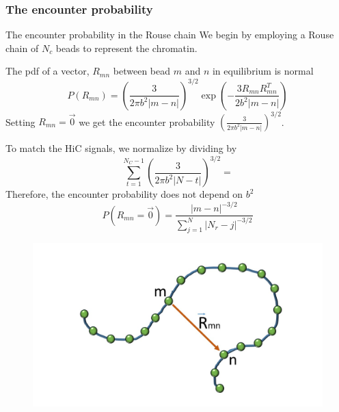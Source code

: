 \documentclass[8pt]{beamer}
\begin{document}
\subsubsection{The encounter probability}\label{subsubsection_theRouseEncounterProbability}
\begin{frame}{The encounter probability in the Rouse chain}
We begin by employing a Rouse chain of $N_c$ beads to represent the chromatin.

The pdf of a vector, $R_{mn}$ between bead $m$ and $n$ in equilibrium is normal
\begin{equation*}
P(R_{mn})=\left(\frac{3}{2\pi b^2 |m-n|}\right)^{3/2}\exp\left(-\frac{3R_{mn}R_{mn}^T}{2b^2|m-n|}\right)
\end{equation*}
Setting $R_{mn}=\vec{0}$ we get the encounter probability 
$\left(\frac{3}{2\pi b^2 |m-n|}\right)^{3/2}$. 

To match the HiC signals, we normalize by dividing by 
\begin{equation*}
\sum_{t=1}^{N_C-1}\left(\frac{3}{2\pi b^2 |N-t|}\right)^{3/2}=
\end{equation*}
Therefore, the encounter probability does not depend on $b^2$ 
\begin{equation*}
P(R_{mn}=\vec{0})=\frac{|m-n|^{-3/2}}{\sum_{j=1}^{N} |N_r-j|^{-3/2}}
\end{equation*}

\begin{figure}[H]
\includegraphics[scale=0.12]{rouseChainVectorBetweenMAndN}
\end{figure}
\end{frame}
\end{document}
